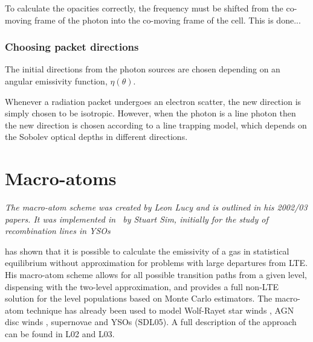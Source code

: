 To calculate the opacities correctly, the frequency must be shifted from
the co-moving frame of the photon into the co-moving frame of the cell.
This is done...




\subsubsection{Choosing packet directions}

The initial directions from the photon sources are chosen
depending on an angular emissivity function, $\eta(\theta)$.


Whenever a radiation packet undergoes an electron scatter,
the new direction is simply chosen to be isotropic. However,
when the photon is a line photon then the new direction is chosen
according to a line trapping model, which depends on the Sobolev
optical depths in different directions. 






\section{Macro-atoms}

{\sl The macro-atom scheme was created by Leon Lucy and is outlined in 
his 2002/03 papers. It was implemented in \py\ by Stuart Sim, initially
for the study of recombination lines in YSOs \citep{simmacro2005}
}

\cite{lucy2002, lucy2003}
has shown that it is possible to calculate the emissivity of a gas in
statistical equilibrium without approximation for problems with large departures
from LTE.
His macro-atom scheme allows for all possible transition paths from a given level,
dispensing with the two-level approximation, and
provides a full non-LTE solution
for the level populations based on Monte Carlo estimators. The macro-atom
technique has already been used to model Wolf-Rayet star
winds \citep{sim2004}, AGN disc winds \citep{simlong2008, tatum2012},
supernovae \citep{kromersim2009, kerzendorfsim} and YSOs (SDL05). A full 
description of the approach can be found in L02 and L03. 

